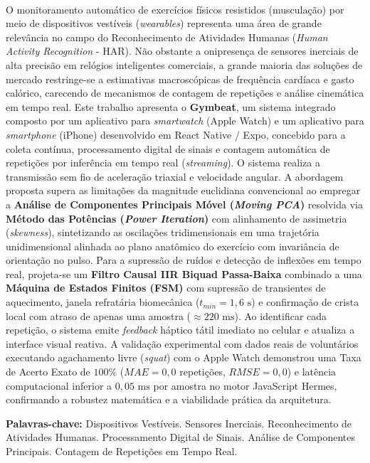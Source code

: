 \documentclass[12pt,openany,oneside,a4paper,english,brazil]{abntex2}
\renewcommand{\imprimircapa}{%
  \begin{capa}%
    \center
    {\ABNTEXchapterfont\bfseries\normalsize \imprimirinstituicao}
    
    \vspace*{3.5cm}
    {\ABNTEXchapterfont\bfseries\Large \imprimirautor}
    
    \vspace*{3.5cm}
    {\ABNTEXchapterfont\bfseries\Large \imprimirtitulo}
    
    \vfill
    {\ABNTEXchapterfont\normalsize \imprimirlocal\\
    \imprimirdata}
    \vspace*{0.5cm}
  \end{capa}
}
\begin{document}
\frenchspacing 

\imprimircapa
\imprimirfolhaderosto

\setlength{\absparsep}{18pt}
\begin{resumo}
O monitoramento automático de exercícios físicos resistidos (musculação) por meio de dispositivos vestíveis (\textit{wearables}) representa uma área de grande relevância no campo do Reconhecimento de Atividades Humanas (\textit{Human Activity Recognition} - HAR). Não obstante a onipresença de sensores inerciais de alta precisão em relógios inteligentes comerciais, a grande maioria das soluções de mercado restringe-se a estimativas macroscópicas de frequência cardíaca e gasto calórico, carecendo de mecanismos de contagem de repetições e análise cinemática em tempo real. Este trabalho apresenta o \textbf{Gymbeat}, um sistema integrado composto por um aplicativo para \textit{smartwatch} (Apple Watch) e um aplicativo para \textit{smartphone} (iPhone) desenvolvido em React Native / Expo, concebido para a coleta contínua, processamento digital de sinais e contagem automática de repetições por inferência em tempo real (\textit{streaming}). O sistema realiza a transmissão sem fio de aceleração triaxial e velocidade angular. A abordagem proposta supera as limitações da magnitude euclidiana convencional ao empregar a \textbf{Análise de Componentes Principais Móvel (\textit{Moving PCA})} resolvida via \textbf{Método das Potências (\textit{Power Iteration})} com alinhamento de assimetria (\textit{skewness}), sintetizando as oscilações tridimensionais em uma trajetória unidimensional alinhada ao plano anatômico do exercício com invariância de orientação no pulso. Para a supressão de ruídos e detecção de inflexões em tempo real, projeta-se um \textbf{Filtro Causal IIR Biquad Passa-Baixa} combinado a uma \textbf{Máquina de Estados Finitos (FSM)} com supressão de transientes de aquecimento, janela refratária biomecânica ($t_{min} = 1{,}6\text{ s}$) e confirmação de crista local com atraso de apenas uma amostra ($\approx 220\text{ ms}$). Ao identificar cada repetição, o sistema emite \textit{feedback} háptico tátil imediato no celular e atualiza a interface visual reativa. A validação experimental com dados reais de voluntários executando agachamento livre (\textit{squat}) com o Apple Watch demonstrou uma Taxa de Acerto Exato de $100\%$ ($MAE = 0{,}0$ repetições, $RMSE = 0{,}0$) e latência computacional inferior a $0{,}05\text{ ms}$ por amostra no motor JavaScript Hermes, confirmando a robustez matemática e a viabilidade prática da arquitetura.

\textbf{Palavras-chave:} Dispositivos Vestíveis. Sensores Inerciais. Reconhecimento de Atividades Humanas. Processamento Digital de Sinais. Análise de Componentes Principais. Contagem de Repetições em Tempo Real.
\end{resumo}
\end{document}
